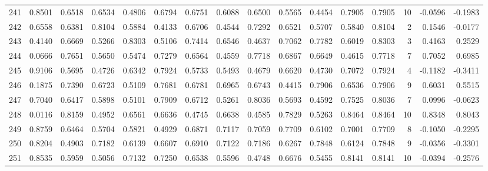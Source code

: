 \begin{tabular}{lrrrrrrrrrrrrrrr}
241 &      0.8501 &  0.6518 &  0.6534 &  0.4806 &  0.6794 &  0.6751 &  0.6088 &  0.6500 &  0.5565 &  0.4454 &   0.7905 &     0.7905 &     10 &                   -0.0596 &                    -0.1983 \\
242 &      0.6558 &  0.6381 &  0.8104 &  0.5884 &  0.4133 &  0.6706 &  0.4544 &  0.7292 &  0.6521 &  0.5707 &   0.5840 &     0.8104 &      2 &                    0.1546 &                    -0.0177 \\
243 &      0.4140 &  0.6669 &  0.5266 &  0.8303 &  0.5106 &  0.7414 &  0.6546 &  0.4637 &  0.7062 &  0.7782 &   0.6019 &     0.8303 &      3 &                    0.4163 &                     0.2529 \\
244 &      0.0666 &  0.7651 &  0.5650 &  0.5474 &  0.7279 &  0.6564 &  0.4559 &  0.7718 &  0.6867 &  0.6649 &   0.4615 &     0.7718 &      7 &                    0.7052 &                     0.6985 \\
245 &      0.9106 &  0.5695 &  0.4726 &  0.6342 &  0.7924 &  0.5733 &  0.5493 &  0.4679 &  0.6620 &  0.4730 &   0.7072 &     0.7924 &      4 &                   -0.1182 &                    -0.3411 \\
246 &      0.1875 &  0.7390 &  0.6723 &  0.5109 &  0.7681 &  0.6781 &  0.6965 &  0.6743 &  0.4415 &  0.7906 &   0.6536 &     0.7906 &      9 &                    0.6031 &                     0.5515 \\
247 &      0.7040 &  0.6417 &  0.5898 &  0.5101 &  0.7909 &  0.6712 &  0.5261 &  0.8036 &  0.5693 &  0.4592 &   0.7525 &     0.8036 &      7 &                    0.0996 &                    -0.0623 \\
248 &      0.0116 &  0.8159 &  0.4952 &  0.6561 &  0.6636 &  0.4745 &  0.6638 &  0.4585 &  0.7829 &  0.5263 &   0.8464 &     0.8464 &     10 &                    0.8348 &                     0.8043 \\
249 &      0.8759 &  0.6464 &  0.5704 &  0.5821 &  0.4929 &  0.6871 &  0.7117 &  0.7059 &  0.7709 &  0.6102 &   0.7001 &     0.7709 &      8 &                   -0.1050 &                    -0.2295 \\
250 &      0.8204 &  0.4903 &  0.7182 &  0.6139 &  0.6607 &  0.6910 &  0.7122 &  0.7186 &  0.6267 &  0.7848 &   0.6124 &     0.7848 &      9 &                   -0.0356 &                    -0.3301 \\
251 &      0.8535 &  0.5959 &  0.5056 &  0.7132 &  0.7250 &  0.6538 &  0.5596 &  0.4748 &  0.6676 &  0.5455 &   0.8141 &     0.8141 &     10 &                   -0.0394 &                    -0.2576 \\

\end{tabular}
